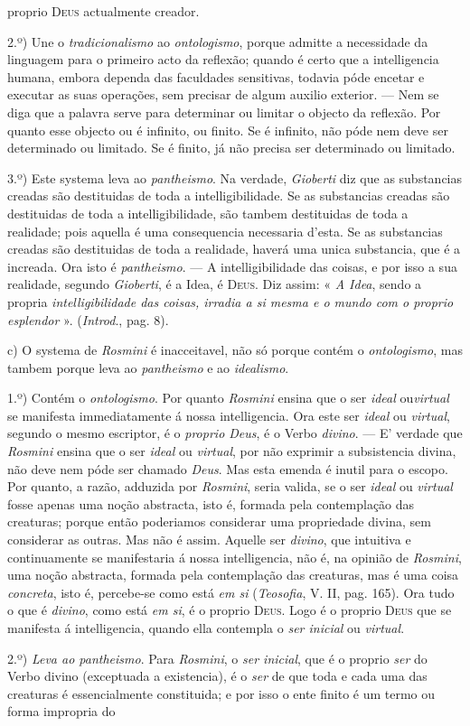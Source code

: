 proprio \textsc{Deus} actualmente creador.\par 2.º) Une o \emph{tradicionalismo} ao \emph{ontologismo}, porque admitte a necessidade da linguagem para o primeiro acto da reflexão; quando é certo que a intelligencia humana, embora dependa das faculdades sensitivas, todavia póde encetar e executar as suas operações, sem precisar de algum auxilio exterior. --- Nem se diga que a palavra serve para determinar ou limitar o objecto da reflexão. Por quanto esse objecto ou é infinito, ou finito. Se é infinito, não póde nem deve ser determinado ou limitado. Se é finito, já não precisa ser determinado ou limitado.\par 3.º) Este systema leva ao \emph{pantheismo}. Na verdade, \emph{Gioberti} diz que as substancias creadas são destituidas de toda a intelligibilidade. Se as substancias creadas são destituidas de toda a intelligibilidade, são tambem destituidas de toda a realidade; pois aquella é uma consequencia necessaria d'esta. Se as substancias creadas são destituidas de toda a realidade, haverá uma unica substancia, que é a increada. Ora isto é \emph{pantheismo}. --- A intelligibilidade das coisas, e por isso a sua realidade, segundo \emph{Gioberti}, é a Idea, é \textsc{Deus}. Diz assim: « \emph{A Idea}, sendo a propria \emph{intelligibilidade das coisas, irradia a si mesma e o mundo com o proprio esplendor} ». (\emph{Introd}., pag. 8).\par c) O systema de \emph{Rosmini} é inacceitavel, não só porque contém o \emph{ontologismo}, mas tambem porque leva ao \emph{pantheismo} e ao \emph{idealismo}.\par 1.º) Contém o \emph{ontologismo}. Por quanto \emph{Rosmini} ensina que o ser \emph{ideal} ou\emph{virtual} se manifesta immediatamente á nossa intelligencia. Ora este ser \emph{ideal} ou \emph{virtual}, segundo o mesmo escriptor, é o \emph{proprio Deus}, é o Verbo \emph{divino}. --- E' verdade que \emph{Rosmini} ensina que o ser \emph{ideal} ou \emph{virtual}, por não exprimir a subsistencia divina, não deve nem póde ser chamado \emph{Deus}. Mas esta emenda é inutil para o escopo. Por quanto, a razão, adduzida por \emph{Rosmini}, seria valida, se o ser \emph{ideal} ou \emph{virtual} fosse apenas uma noção abstracta, isto é, formada pela contemplação das creaturas; porque então poderiamos considerar uma propriedade divina, sem considerar as outras. Mas não é assim. Aquelle ser \emph{divino}, que intuitiva e continuamente se manifestaria á nossa intelligencia, não é, na opinião de \emph{Rosmini}, uma noção abstracta, formada pela contemplação das creaturas, mas é uma coisa \emph{concreta}, isto é, percebe-se como está \emph{em si} (\emph{Teosofia}, V. II, pag. 165). Ora tudo o que é \emph{divino}, como está \emph{em si}, é o proprio \textsc{Deus}. Logo é o proprio \textsc{Deus} que se manifesta á intelligencia, quando ella contempla o \emph{ser inicial} ou \emph{virtual}.\par 2.º) \emph{Leva ao pantheismo}. Para \emph{Rosmini}, o \emph{ser inicial}, que é o proprio \emph{ser} do Verbo divino (exceptuada a existencia), é o \emph{ser} de que toda e cada uma das creaturas é essencialmente constituida; e por isso o ente finito é um termo ou forma impropria do 